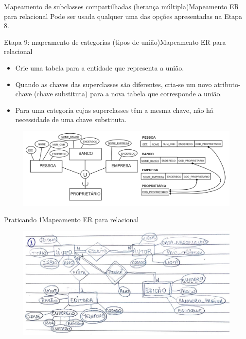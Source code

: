 \documentclass[t]{beamer}
\begin{document}

\begin{ftst}{Mapeamento de subclasses compartilhadas (herança múltipla)}{Mapeamento ER para relacional}
\small
Pode ser usada qualquer uma das opções apresentadas na Etapa 8.


\end{ftst}


\begin{ftst}{Etapa 9: mapeamento de categorias (tipos de união)}{Mapeamento ER para relacional}
\small
\begin{itemize}
    \item Crie uma tabela para a entidade que representa a união.
    \item Quando as chaves das superclasses são diferentes, cria-se um novo atributo-chave (chave substituta) para a nova tabela que corresponde a união.
    \item Para uma categoria cujas superclasses têm a mesma chave, não há necessidade de uma chave substituta.
\end{itemize}

\begin{figure}
    \centering
    \includegraphics[scale=0.11]{Figuras/03_17.png}
\end{figure}
\end{ftst}


\begin{ftst}{Praticando 1}{Mapeamento ER para relacional}

\begin{figure}
    \centering
    \includegraphics[scale=0.5]{Praticando_figuras/1.jpg}
\end{figure}
\end{ftst}
\end{document}
